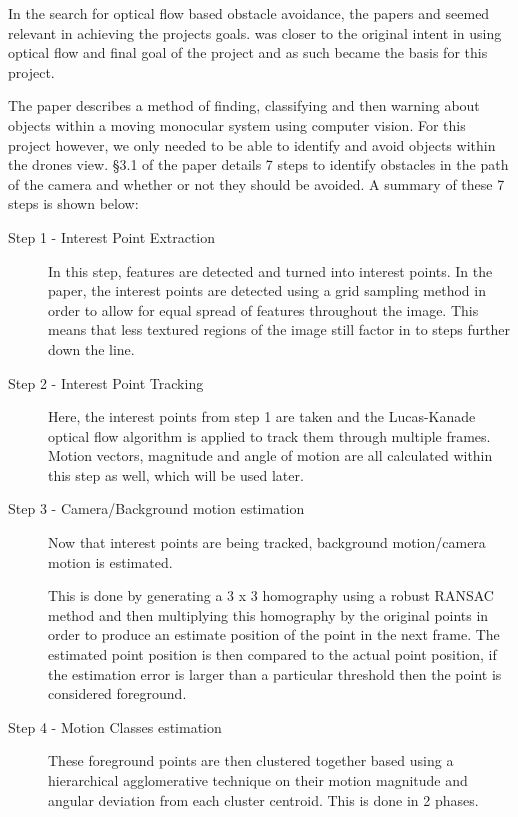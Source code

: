  In the search for optical flow based obstacle avoidance, the papers \cite{souhila2007optical} and \cite{PhoneObstacleAvoidance} seemed relevant in achieving the projects goals. \cite{PhoneObstacleAvoidance} was closer to the original intent in using optical flow and final goal of the project and as such became the basis for this project.
 
 The paper describes a method of finding, classifying and then warning about objects within a moving monocular system using computer vision. For this project however, we only needed to be able to identify and avoid objects within the drones view. \S3.1 of the paper details 7 steps to identify obstacles in the path of the camera and whether or not they should be avoided. A summary of these 7 steps is shown below:
\begin{description}
	\item [Step 1 - Interest Point Extraction] In this step, features are detected and turned into interest points. In the paper, the interest points are detected using a grid sampling method in order to allow for equal spread of features throughout the image. This means that less textured regions of the image still factor in to steps further down the line.
	
	\item[Step 2 - Interest Point Tracking] Here, the interest points from step 1 are taken and the Lucas-Kanade \cite{Lucas_KanadeOF} optical flow algorithm is applied to track them through multiple frames. Motion vectors, magnitude and angle of motion are all calculated within this step as well, which will be used later.
	
	\item[Step 3 - Camera/Background motion estimation] Now that interest points are being tracked, background motion/camera motion is estimated.
	
	This is done by generating a 3 x 3 homography using a robust RANSAC method and then multiplying this homography by the original points in order to produce an estimate position of the point in the next frame. The estimated point position is then compared to the actual point position, if the estimation error is larger than a particular threshold then the point is considered foreground.
	
	\item[Step 4 - Motion Classes estimation] These foreground points are then clustered together based using a hierarchical agglomerative technique on their motion magnitude and angular deviation from each cluster centroid. This is done in 2 phases. 
	

\end{description}
